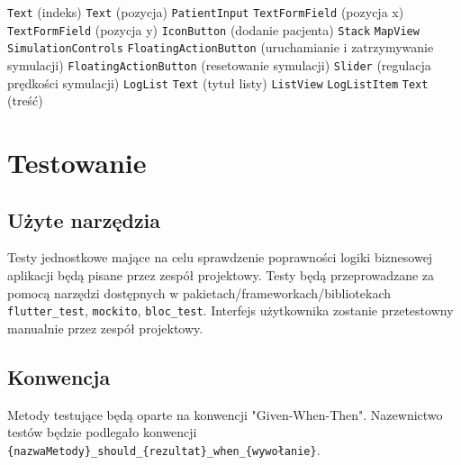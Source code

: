 \documentclass{article}
\newcommand\tab[1][1cm]{\hspace*{#1}}
\begin{document}
\tab\tab\tab\tab\tab\texttt{Text} (indeks) \newline
\tab\tab\tab\tab\tab\texttt{Text} (pozycja) \newline
\tab\tab\texttt{PatientInput} \newline
\tab\tab\tab\texttt{TextFormField} (pozycja x) \newline
\tab\tab\tab\texttt{TextFormField} (pozycja y) \newline
\tab\tab\tab\texttt{IconButton} (dodanie pacjenta) \newline
\tab\texttt{Stack} \newline
\tab\tab\texttt{MapView} \newline
\tab\tab\texttt{SimulationControls} \newline
\tab\tab\tab\texttt{FloatingActionButton} (uruchamianie i zatrzymywanie symulacji) \newline
\tab\tab\tab\texttt{FloatingActionButton} (resetowanie symulacji) \newline
\tab\tab\tab\texttt{Slider} (regulacja prędkości symulacji) \newline
\tab\texttt{LogList} \newline
\tab\tab\texttt{Text} (tytuł listy) \newline
\tab\tab\texttt{ListView} \newline
\tab\tab\tab\texttt{LogListItem} \newline
\tab\tab\tab\tab\texttt{Text} (treść) \newline

\section{Testowanie}
\subsection{Użyte narzędzia}
Testy jednostkowe mające na celu sprawdzenie poprawności logiki biznesowej aplikacji będą pisane przez zespół projektowy. Testy będą przeprowadzane za pomocą narzędzi dostępnych w pakietach/frameworkach/bibliotekach  \texttt{flutter\_test}, \texttt{mockito},  \texttt{bloc\_test}. Interfejs użytkownika zostanie przetestowny manualnie przez zespół projektowy.

\subsection{Konwencja}
Metody testujące będą oparte na konwencji "Given-When-Then". Nazewnictwo testów będzie podlegało konwencji \texttt{\{nazwaMetody\}\_should\_\{rezultat\}\_when\_\{wywołanie\}}.
\end{document}
